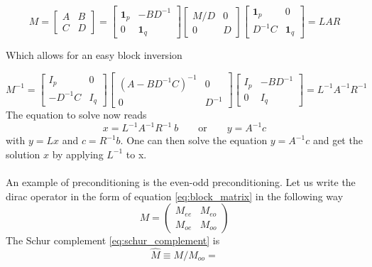 \begin{equation*}
M=\left[\begin{array}{ll}
A & B \\
C & D
\end{array}\right]=\left[\begin{array}{cc}
\mathbf{1}_p & -B D^{-1} \\
0 & \mathbf{1}_q
\end{array}\right]\left[\begin{array}{cc}
M / D & 0 \\
0 & D
\end{array}\right]\left[\begin{array}{cc}
\mathbf{1}_p & 0 \\
D^{-1} C & \mathbf{1}_q
\end{array}\right] = L A R
\end{equation*}

Which allows for an easy block inversion

\begin{equation*}
M^{-1} = \left[\begin{array}{cc}
I_p & 0 \\
-D^{-1} C & I_q
\end{array}\right]\left[\begin{array}{cc}
\left(A-B D^{-1} C\right)^{-1} & 0 \\
0 & D^{-1}
\end{array}\right]\left[\begin{array}{cc}
I_p & -B D^{-1} \\
0 & I_q
\end{array}\right]
= L^{-1} A^{-1} R^{-1}
\end{equation*}
The equation to solve now reads
\begin{equation*}
x = L^{-1} A^{-1} R^{-1} \ b \qquad \text{or} \qquad  y = A^{-1} c
\end{equation*}
with $y = L x$ and $c = R^{-1} b$. One can then solve the equation $y = A^{-1}c$ and get the solution $x$ by applying $L^{-1}$ to x. \\~\\
An example of preconditioning is the even-odd preconditioning. Let us write the dirac operator in the form of equation \eqref{eq:block_matrix} in the following way
\begin{equation*}
     M = \begin{pmatrix*}
        M_{ee} & M_{eo} \\ M_{oe} & M_{oo}
    \end{pmatrix*}
\end{equation*}
The Schur complement \eqref{eq:schur_complement} is 
\begin{equation*}
    \hat M \equiv M/M_{oo} = 
\end{equation*}

